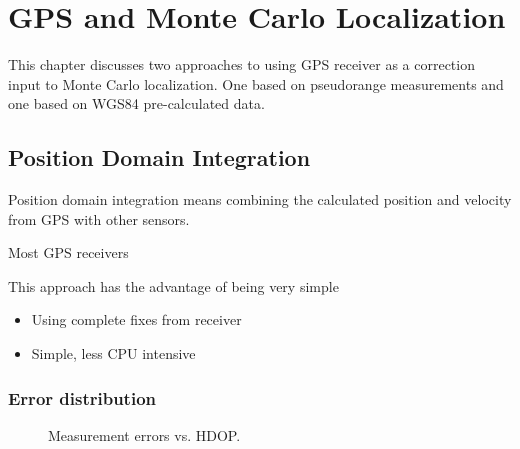 \chapter{GPS and Monte Carlo Localization}
\label{chap:gps_and_mcl}

This chapter discusses two approaches to using GPS receiver as a correction input
to Monte Carlo localization. One based on pseudorange measurements and one based on
WGS84 pre-calculated data.



\section{Position Domain Integration}
Position domain integration means combining the calculated position and velocity from
GPS with other sensors.

Most GPS receivers 

This approach has the advantage of being very simple 

\begin{itemize}
\item Using complete fixes from receiver
\item Simple, less CPU intensive
\end{itemize}

\subsection{Error distribution}

\begin{figure}[ht]
	\centering
	
	\caption{Measurement errors vs. HDOP.}
	\label{fig:wgs84_hdop_error}

\end{figure}

